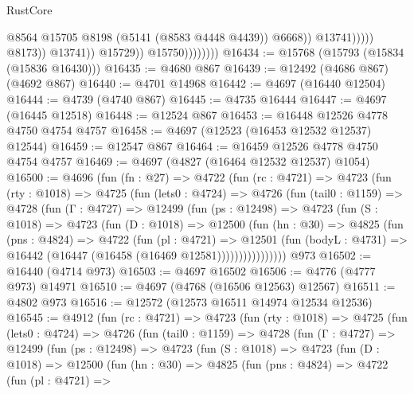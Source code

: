 \begin{lexlean}{RustCore}
\begin{coremodule}
                                              @8564
                                              @15705
                                              @8198
                                              (@5141 (@8583 @4448 @4439))
                                              @6668))
                                          @13741)))))
                                @8173))
                            @13741))
                        @15729))
                    @15750))))))))
@16434 := @15768 (@15793 (@15834 (@15836 @16430)))
@16435 := @4680 @867
@16439 := @12492 (@4686 @867) (@4692 @867)
@16440 := @4701 @14968
@16442 := @4697 (@16440 @12504)
@16444 := @4739 (@4740 @867)
@16445 := @4735 @16444
@16447 := @4697 (@16445 @12518)
@16448 := @12524 @867
@16453 := @16448 @12526 @4778 @4750 @4754 @4757
@16458 := @4697 (@12523 (@16453 @12532 @12537) @12544)
@16459 := @12547 @867
@16464 := @16459 @12526 @4778 @4750 @4754 @4757
@16469 := @4697 (@4827 (@16464 @12532 @12537) @1054)
@16500 := @4696
    (fun (fn : @27) =>
    @4722
      (fun (rc : @4721) =>
      @4723
        (fun (rty : @1018) =>
        @4725
          (fun (lets0 : @4724) =>
          @4726
            (fun (tail0 : @1159) =>
            @4728
              (fun (Γ : @4727) =>
              @12499
                (fun (ps : @12498) =>
                @4723
                  (fun (S : @1018) =>
                  @4723
                    (fun (D : @1018) =>
                    @12500
                      (fun (hn : @30) =>
                      @4825
                        (fun (pns : @4824) =>
                        @4722
                          (fun (pl : @4721) =>
                          @12501
                            (fun (bodyL : @4731) =>
                            @16442 (@16447 (@16458 (@16469 @12581))))))))))))))))
    @973
@16502 := @16440 (@4714 @973)
@16503 := @4697 @16502
@16506 := @4776 (@4777 @973) @14971
@16510 := @4697 (@4768 (@16506 @12563) @12567)
@16511 := @4802 @973
@16516 := @12572 (@12573 @16511 @14974 @12534 @12536)
@16545 := @4912
    (fun (rc : @4721) =>
    @4723
      (fun (rty : @1018) =>
      @4725
        (fun (lets0 : @4724) =>
        @4726
          (fun (tail0 : @1159) =>
          @4728
            (fun (Γ : @4727) =>
            @12499
              (fun (ps : @12498) =>
              @4723
                (fun (S : @1018) =>
                @4723
                  (fun (D : @1018) =>
                  @12500
                    (fun (hn : @30) =>
                    @4825
                      (fun (pns : @4824) =>
                      @4722
                        (fun (pl : @4721) =>

\end{coremodule}
\end{lexlean}
